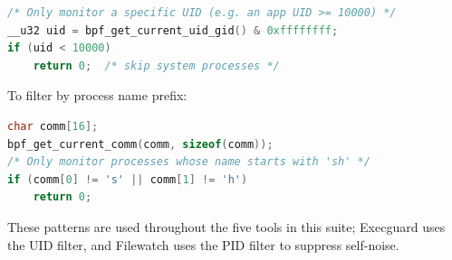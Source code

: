 \documentclass{mnitjaipur}
\begin{document}
\begin{lstlisting}[language=C]
/* Only monitor a specific UID (e.g. an app UID >= 10000) */
__u32 uid = bpf_get_current_uid_gid() & 0xffffffff;
if (uid < 10000)
    return 0;  /* skip system processes */
\end{lstlisting}

To filter by process name prefix:
\begin{lstlisting}[language=C]
char comm[16];
bpf_get_current_comm(comm, sizeof(comm));
/* Only monitor processes whose name starts with 'sh' */
if (comm[0] != 's' || comm[1] != 'h')
    return 0;
\end{lstlisting}

These patterns are used throughout the five tools in this suite; Execguard uses the UID filter, and Filewatch uses the PID filter to suppress self-noise.

\clearpage
{}


\end{document}
